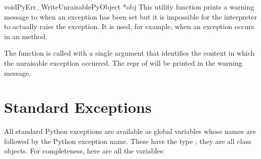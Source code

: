 \begin{cfuncdesc}{void}{PyErr_WriteUnraisable}{PyObject *obj}
  This utility function prints a warning message to 
  when an exception has been set but it is impossible for the
  interpreter to actually raise the exception.  It is used, for
  example, when an exception occurs in an  method.

  The function is called with a single argument  that
  identifies the context in which the unraisable exception occurred.
  The repr of  will be printed in the warning message.
\end{cfuncdesc}

\section{Standard Exceptions \label{standardExceptions}}

All standard Python exceptions are available as global variables whose
names are  followed by the Python exception name.  These
have the type ; they are all class objects.  For
completeness, here are all the variables:

